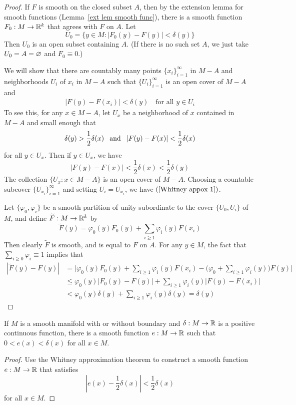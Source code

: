 \begin{proof}
If $F$ is smooth on the closed subset $A$, then by the extension lemma for smooth functions (Lemma~\ref{ext lem smooth func}), there is a smooth function $F_0:M\to\mathbb{R}^k$ that agrees with $F$ on $A$. Let 
\[U_0=\{y\in M:|F_0(y)-F(y)|<\delta(y)\}\]
Then $U_0$ is an open subset containing $A$. (If there is no such set $A$, we just take $U_0=A=\varnothing$ and $F_0\equiv0$.)\par
We will show that there are countably many points $\{x_i\}_{i=1}^{\infty}$ in $M-A$ and neighborhoods $U_i$ of $x_i$ in $M-A$ such that $\{U_i\}_{i=1}^{\infty}$ is an open cover of $M-A$ and
\begin{align}\label{Whitney appox-1}
|F(y)-F(x_i)|<\delta(y)\quad\text{for all }y\in U_i
\end{align}
To see this, for any $x\in M-A$, let $U_x$ be a neighborhood of $x$ contained in $M-A$ and small enough that
\[\delta(y)>\frac{1}{2}\delta(x)\hspace{8pt}\text{and}\hspace{8pt} |F(y)-F(x)|<\frac{1}{2}\delta(x)\]
for all $y\in U_x$. Then if $y\in U_x$, we have \[|F(y)-F(x)|<\frac{1}{2}\delta(x)<\frac{1}{2}\delta(y)\]
The collection $\{U_x:x\in M-A\}$ is an open cover of $M-A$. Choosing a countable subcover $\{U_{x_i}\}_{i=1}^{\infty}$ and setting $U_i=U_{x_i}$, we have $(\ref{Whitney appox-1})$.\par
Let $\{\varphi_0,\varphi_i\}$ be a smooth partition of unity subordinate to the cover $\{U_0,U_i\}$ of $M$, and define $\widetilde{F}:M\to\mathbb{R}^k$ by
\[\widetilde{F}(y)=\varphi_0(y)F_0(y)+\sum_{i\geq 1}\varphi_i(y)F(x_i)\]
Then clearly $\widetilde{F}$ is smooth, and is equal to $F$ on $A$. For any $y\in M$, the fact that $\sum_{i\geq 0}\varphi_i\equiv 1$ implies that
\begin{align*}
|\widetilde{F}(y)-F(y)|&=\Big|\varphi_0(y)F_0(y)+\sum_{i\geq 1}\varphi_i(y)F(x_i)-\Big(\varphi_0+\sum_{i\geq 1}\varphi_i(y)\Big)F(y)\Big|\\
&\leq\varphi_0(y)|F_0(y)-F(y)|+\sum_{i\geq 1}\varphi_i(y)|F(y)-F(x_i)|\\
&<\varphi_0(y)\delta(y)+\sum_{i\geq 1}\varphi_i(y)\delta(y)=\delta(y)
\end{align*}
\end{proof}
\begin{corollary}\label{appox positive function}
If $M$ is a smooth manifold with or without boundary and $\delta:M\to\mathbb{R}$ is a positive continuous function, there is a smooth function $e:M\to\mathbb{R}$ such that $0<e(x)<\delta(x)$ for all $x\in M$.
\end{corollary}
\begin{proof}
Use the Whitney approximation theorem to construct a smooth function $e:M\to\mathbb{R}$ that satisfies
\[|e(x)-\frac{1}{2}\delta(x)|<\frac{1}{2}\delta(x)\]
for all $x\in M$.
\end{proof}
